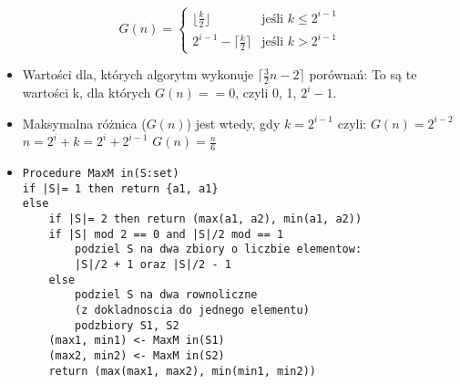 \documentclass[a4paper,10pt]{article}
\begin{document}
		$$G(n) = \begin{cases}
		    \lfloor \frac{k}{2} \rfloor & \text{jeśli } k\leq 2^{i-1} \\
		    2^{i - 1} - \lceil \frac{k}{2} \rceil & \text{jeśli } k > 2^{i-1} 
	    \end{cases}
		$$
\begin{itemize}
	\item Wartości dla, których algorytm wykonuje $\lceil \frac{3}{2} n - 2 \rceil $ porównań: \newline
	To są te wartości k, dla których $G(n) == 0$, czyli {0, 1, $2^i-1$}. \newline
	\item Maksymalna różnica ($G(n)$) jest wtedy, gdy $ k = 2^{i-1}$ czyli: $G(n) = 2^{i-2}$ \newline
	$n = 2^i + k = 2^i + 2^{i-1}$ \newline
	$G(n) = \frac{n}{6}$\newline
	\item
	\begin{lstlisting}
Procedure MaxM in(S:set)
if |S|= 1 then return {a1, a1}
else
    if |S|= 2 then return (max(a1, a2), min(a1, a2))
    if |S| mod 2 == 0 and |S|/2 mod == 1
        podziel S na dwa zbiory o liczbie elementow:
        |S|/2 + 1 oraz |S|/2 - 1
    else
        podziel S na dwa rownoliczne 
        (z dokladnoscia do jednego elementu)
        podzbiory S1, S2
    (max1, min1) <- MaxM in(S1)
    (max2, min2) <- MaxM in(S2)
    return (max(max1, max2), min(min1, min2))
\end{lstlisting}
\end{itemize}
		
\end{document}
